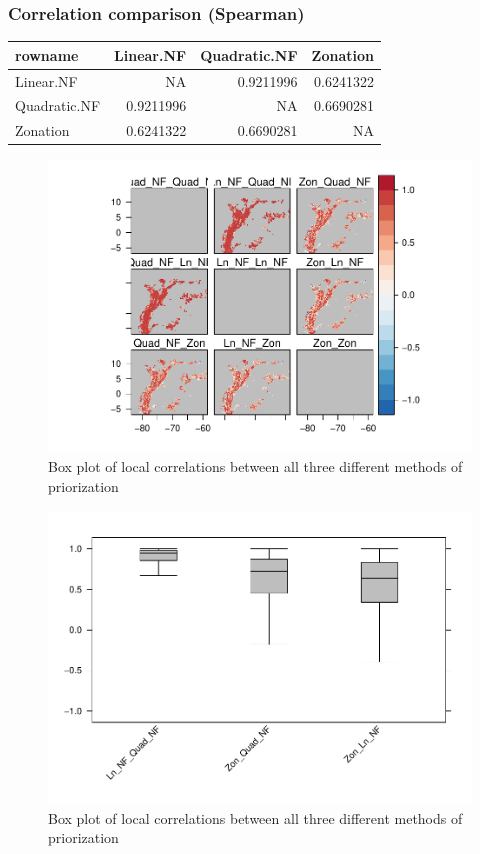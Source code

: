 \documentclass[]{article}
\begin{document}
\hypertarget{correlation-comparison-spearman}{%
\subsubsection{Correlation comparison (Spearman)}\label{correlation-comparison-spearman}}

\begin{table}[H]
\centering
\begin{tabular}{lrrr}
\toprule
rowname & Linear.NF & Quadratic.NF & Zonation\\
\midrule
Linear.NF & NA & 0.9211996 & 0.6241322\\
Quadratic.NF & 0.9211996 & NA & 0.6690281\\
Zonation & 0.6241322 & 0.6690281 & NA\\
\bottomrule
\end{tabular}
\end{table}

\begin{figure}
\centering
\includegraphics{NFPaper_files/figure-latex/LocalCorr-1.pdf}
\caption{\label{fig:LocalCorr}Box plot of local correlations between all three different methods of priorization}
\end{figure}

\begin{figure}
\centering
\includegraphics{NFPaper_files/figure-latex/Boxplot-1.pdf}
\caption{\label{fig:Boxplot}Box plot of local correlations between all three different methods of priorization}
\end{figure}
\end{document}
